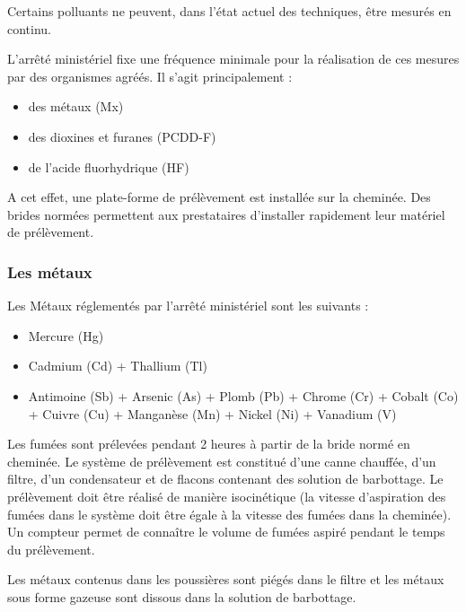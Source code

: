 Certains polluants ne peuvent, dans l’état actuel des techniques, être mesurés en continu.
\vspace{0.3cm}

L’arrêté ministériel fixe une fréquence minimale pour la réalisation de ces mesures par des organismes agréés.
Il s’agit principalement :

\begin{itemize}
\item	des métaux (Mx)
\item	des dioxines et furanes (PCDD-F)
\item	de l'acide fluorhydrique (HF)
\end{itemize}

A cet effet, une plate-forme de prélèvement est installée sur la cheminée. Des brides normées permettent aux prestataires d’installer rapidement leur matériel de prélèvement.


\subsubsection{Les métaux}

Les Métaux réglementés par l'arrêté ministériel sont les suivants :
\begin{itemize}

\item	Mercure (Hg)
\item	Cadmium (Cd) + Thallium (Tl)
\item	Antimoine (Sb) + Arsenic (As) + Plomb (Pb) + Chrome (Cr) + Cobalt (Co) + Cuivre (Cu) + Manganèse (Mn) + Nickel (Ni) + Vanadium (V)

\end{itemize}

Les fumées sont prélevées pendant 2 heures à partir de la bride normé en cheminée. Le système de prélèvement est constitué d’une canne chauffée, d’un filtre, d’un condensateur et de flacons contenant des solution de barbottage. Le prélèvement doit être réalisé de manière isocinétique (la vitesse d’aspiration des fumées dans le système doit être égale à la vitesse des fumées dans la cheminée). Un compteur permet de connaître le volume de fumées aspiré pendant le temps du prélèvement.

\vspace{0.3cm}

Les métaux contenus dans les poussières sont piégés dans le filtre et les métaux sous forme gazeuse sont dissous dans la solution de barbottage.
\vspace{0.3cm}


